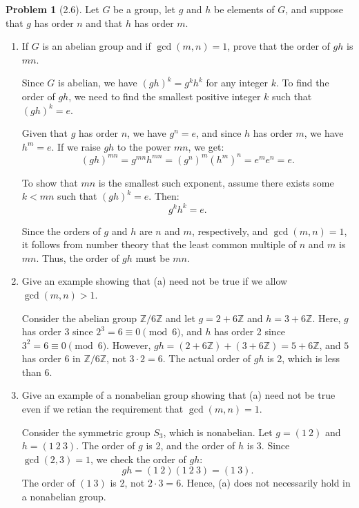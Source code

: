 \documentclass[12pt]{article}
\theoremstyle{definition}
\newtheorem{problem}{Problem}
\begin{document}
\begin{problem}[2.6]
    Let $G$ be a group, let $g$ and $h$ be elements of $G$, and suppose that $g$ has order $n$ and that $h$ has order $m$.
    \begin{enumerate}[label=(\alph*)]
        \item If $G$ is an abelian group and if $\gcd(m, n) = 1$, prove that the order of $gh$ is $mn$.
        
        \begin{solution}
            Since $G$ is abelian, we have $(gh)^k = g^k h^k$ for any integer $k$. To find the order of $gh$, we need to find the smallest positive integer $k$ such that $(gh)^k = e$.
            
            Given that $g$ has order $n$, we have $g^n = e$, and since $h$ has order $m$, we have $h^m = e$. If we raise $gh$ to the power $mn$, we get:
            \[
                (gh)^{mn} = g^{mn} h^{mn} = (g^n)^m (h^m)^n = e^m e^n = e.
            \]
            
            To show that $mn$ is the smallest such exponent, assume there exists some $k < mn$ such that $(gh)^k = e$. Then:
            \[
                g^k h^k = e.
            \]
            
            Since the orders of $g$ and $h$ are $n$ and $m$, respectively, and $\gcd(m, n) = 1$, it follows from number theory that the least common multiple of $n$ and $m$ is $mn$. Thus, the order of $gh$ must be $mn$.
        \end{solution}
        \item Give an example showing that (a) need not be true if we allow $\gcd(m, n) > 1$.
        
        \begin{solution}
            Consider the abelian group $\mathbb{Z}/6\mathbb{Z}$ and let $g = 2 + 6\mathbb{Z}$ and $h = 3 + 6\mathbb{Z}$. Here, $g$ has order 3 since $2^3 = 6 \equiv 0 \pmod{6}$, and $h$ has order 2 since $3^2 = 6 \equiv 0 \pmod{6}$. However, $gh = (2 + 6\mathbb{Z}) + (3 + 6\mathbb{Z}) = 5 + 6\mathbb{Z}$, and $5$ has order 6 in $\mathbb{Z}/6\mathbb{Z}$, not $3 \cdot 2 = 6$. The actual order of $gh$ is 2, which is less than 6.
        \end{solution}
        \item Give an example of a nonabelian group showing that (a) need not be true even if we retian the requirement that $\gcd(m, n) = 1$.
        
        \begin{solution}
            Consider the symmetric group $S_3$, which is nonabelian. Let $g = (1\ 2)$ and $h = (1\ 2\ 3)$. The order of $g$ is 2, and the order of $h$ is 3. Since $\gcd(2,3) = 1$, we check the order of $gh$:
            \[
                gh = (1\ 2)(1\ 2\ 3) = (1\ 3).
            \]
            The order of $(1\ 3)$ is 2, not $2 \cdot 3 = 6$. Hence, (a) does not necessarily hold in a nonabelian group.
        

\end{solution}
\end{enumerate}
\end{problem}
\end{document}
